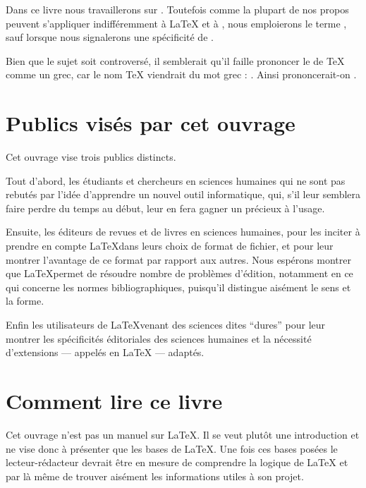 Dans  ce livre nous travaillerons sur \XeLaTeX{}. Toutefois comme la plupart de nos propos peuvent s'appliquer indifféremment  à \LaTeX{} et à \XeLaTeX{}, nous emploierons
le terme \forme{\LaTeX{}}, sauf lorsque nous signalerons une spécificité de \XeLaTeX{}.

\begin{plusloins}
Bien que le sujet soit controversé, il semblerait qu'il faille prononcer le   de \TeX{} comme un  grec, car le nom \TeX{} viendrait du mot grec  : . Ainsi prononcerait-on .
\end{plusloins}


\section{Publics visés par cet ouvrage}

Cet ouvrage vise  trois publics distincts.

Tout d'abord, les étudiants et chercheurs en sciences humaines qui ne sont pas rebutés par l'idée d'apprendre un nouvel outil informatique, qui, s'il leur semblera faire perdre du temps au début, leur en fera gagner un précieux  à l'usage.

Ensuite, les éditeurs de revues et de livres en sciences humaines, pour les inciter à prendre en compte \LaTeX dans leurs choix de format de fichier, et pour leur montrer l'avantage de ce format par rapport aux autres. Nous espérons montrer que \LaTeX permet de résoudre nombre de problèmes d'édition, notamment en ce qui concerne les normes bibliographiques, puisqu'il distingue aisément le sens et la forme.

Enfin les utilisateurs de \LaTeX venant des sciences dites \enquote{dures} pour leur montrer les spécificités éditoriales des sciences humaines et la nécessité d'extensions --- appelés  en \LaTeX{} --- adaptés.


\section{Comment lire ce livre}

Cet ouvrage n'est pas un manuel sur \LaTeX{}. Il se veut plutôt une introduction et ne vise donc à présenter que les bases de \LaTeX{}. Une fois ces bases posées le lecteur-rédacteur devrait être en mesure de comprendre la logique de \LaTeX{} et par là même de trouver aisément les informations utiles à son projet.


